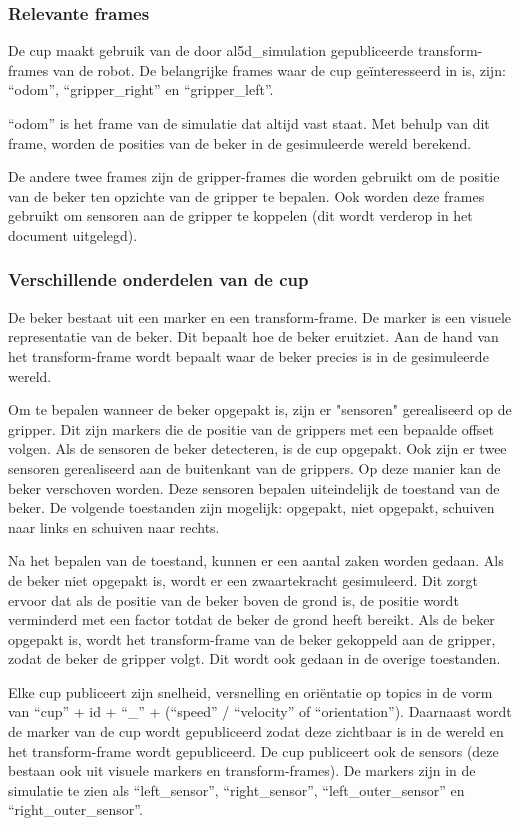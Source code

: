 \documentclass[11pt,titlepage]{article}
\begin{document}
\subsubsection{Relevante frames}
De cup maakt gebruik van de door al5d\_simulation gepubliceerde transform-frames van de robot. De belangrijke frames waar de cup geïnteresseerd in is, zijn: ``odom'', ``gripper\_right'' en ``gripper\_left''.

``odom'' is het frame van de simulatie dat altijd vast staat. Met behulp van dit frame, worden de posities van de beker in de gesimuleerde wereld berekend.

De andere twee frames zijn de gripper-frames die worden gebruikt om de positie van de beker ten opzichte van de gripper te bepalen. Ook worden deze frames gebruikt om sensoren aan de gripper te koppelen (dit wordt verderop in het document uitgelegd).

\subsubsection{Verschillende onderdelen van de cup}

De beker bestaat uit een marker en een transform-frame. De marker is een visuele representatie van de beker. Dit bepaalt hoe de beker eruitziet. Aan de hand van het transform-frame wordt bepaalt waar de beker precies is in de gesimuleerde wereld.

Om te bepalen wanneer de beker opgepakt is, zijn er "sensoren" gerealiseerd op de gripper. Dit zijn markers die de positie van de grippers met een bepaalde offset volgen. Als de sensoren de beker detecteren, is de cup opgepakt. Ook zijn er twee sensoren gerealiseerd aan de buitenkant van de grippers. Op deze manier kan de beker verschoven worden. Deze sensoren bepalen uiteindelijk de toestand van de beker. De volgende toestanden zijn mogelijk: opgepakt, niet opgepakt, schuiven naar links en schuiven naar rechts.

Na het bepalen van de toestand, kunnen er een aantal zaken worden gedaan. Als de beker niet opgepakt is, wordt er een zwaartekracht gesimuleerd. Dit zorgt ervoor dat als de positie van de beker boven de grond is, de positie wordt verminderd met een factor totdat de beker de grond heeft bereikt. Als de beker opgepakt is, wordt het transform-frame van de beker gekoppeld aan de gripper, zodat de beker de gripper volgt. Dit wordt ook gedaan in de overige toestanden.

Elke cup publiceert zijn snelheid, versnelling en oriëntatie op topics in de vorm van ``cup'' + id + ``\_'' + (``speed'' / ``velocity'' of ``orientation''). Daarnaast wordt de marker van de cup wordt gepubliceerd zodat deze zichtbaar is in de wereld en het transform-frame wordt gepubliceerd. De cup publiceert ook de sensors (deze bestaan ook uit visuele markers en transform-frames). De markers zijn in de simulatie te zien als ``left\_sensor'', ``right\_sensor'', ``left\_outer\_sensor'' en ``right\_outer\_sensor''. 
\end{document}
